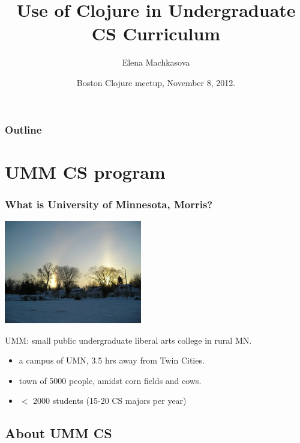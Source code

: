 \documentclass{beamer}
\begin{document}
\title{Use of Clojure in Undergraduate CS Curriculum}
\author{Elena Machkasova}
\date[]  
{ Boston Clojure meetup, November 8, 2012.}

\begin{frame}
  \titlepage
\end{frame}

\begin{frame}

  \frametitle{Outline}
\tableofcontents
\end{frame}

\section{UMM CS program}

\begin{frame}
  \frametitle{What is University of Minnesota, Morris?}
{\center \qquad \qquad \quad
\includegraphics[height=45mm]{halo.jpg}
}

UMM: small public undergraduate liberal arts college in rural MN.
\begin{itemize}
\item a campus of UMN, 3.5 hrs away from Twin Cities. 
\item town of 5000 people, amidst corn fields and cows. 
\item $<$ 2000 students (15-20 CS majors per year)
\end{itemize}

\end{frame}

\subsection{About UMM CS}
\end{document}
